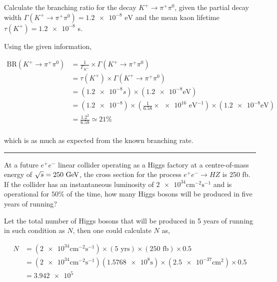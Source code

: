 \begin{problem}{3.3}
Calculate the branching ratio for the decay $K^+\to\pi^+\pi^0$, given the partial decay width $\Gamma(K^+\to\pi^+\pi^0)=\num{1.2e-8} \text{ eV}$
and the mean kaon lifetime $\tau(K^+)=\num{1.2e-8}$ s.
\end{problem}
\begin{solution}
Using the given information, 

\begin{align*}
    \text{BR}\left(K^+\to\pi^+\pi^0\right) &= \frac{1}{\Gamma_{K^+}} \times \Gamma\left( K^+ \to \pi^+\pi^0 \right) \\[0.15in]
                                           &= \tau( K^+ )\times \Gamma\left( K^+ \to \pi^+\pi^0 \right) \\[0.15in]
                                           &= \left( \num{1.2e-8}\unit{ s} \right) \times \left( \num{1.2e-8} \text{eV}\right) \\[0.15in]
                                           &= \left( \num{1.2e-8} \right)  \times \left( \frac{1}{6.58} \times \num{e16} \text{ eV}^{-1} \right)  \times \left( \num{1.2e-8} \text{eV}\right) \\[0.15in]
                                           &= \frac{1.2^2}{6.58} \simeq \boxed{21\%}
\end{align*}\\
which is as much as expected from the known branching rate.\\
\end{solution} 
\noindent\rule{7in}{1.5pt}
    

\begin{problem}{3.4}
At a future $e^+e^-$ linear collider operating as a Higgs factory at a centre-of-mass energy of $\sqrt{s}=250\text{ GeV}$, the cross section
for the process $e^+e^-\to HZ$ is 250 fb. If the collider has an instantaneous luminosity of $\num{2e34}\unit{\centi\metre^{-2}\second^{-1}}$
and is operational for $50\%$ of the time, how many Higgs bosons will be produced in five years of running?
\end{problem}
\begin{solution}
Let the total number of Higgs bosons that will be produced in 5 years of running in such condition as $N$, then one could calculate $N$ as,

\begin{align*}
    N &= \left( \num{2e34}\unit{\centi\metre^{-2}\second^{-1}} \right) \times \left( 5 \text{ yrs} \right) \times \left( 250 \text{ fb} \right) \times 0.5 \\[0.15in]
      &= \left( \num{2e34}\unit{\centi\metre^{-2}\second^{-1}} \right) \left( \num{1.5768e8} \unit{\second} \right) \times \left( \num{2.5e-37} \unit{\centi\metre^2} \right) \times 0.5 \\[0.15in]
      &= \num{3.942e5}
\end{align*}
\end{solution} 

